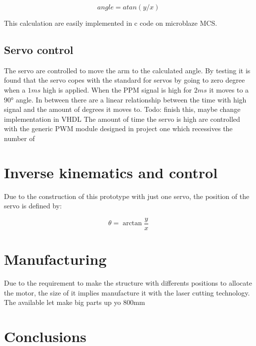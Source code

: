 		\begin{equation}
			angle = atan(y/x)
			\label{eq:angle}
		\end{equation}

		This calculation are easily implemented in c code on microblaze MCS.

		\subsection{Servo control}
		The servo are controlled to move the arm to the calculated angle. By testing it is found that the servo copes with the standard for servos by going to zero degree when a $1\si{ms}$ high is applied. When the PPM signal is high for $2\si{ms}$ it moves to a $90\si{\degree}$ angle. In between there are a linear relationship between the time with high signal and the amount of degrees it moves to.
		Todo: finish this, maybe change implementation in VHDL
		The amount of time the servo is high are controlled with the generic PWM module designed in project one which recessives the number of



	\section{Inverse kinematics and control}
		Due to the construction of this prototype with just one servo, the position of the servo is defined by:

		$$\theta = \arctan\frac{y}{x}$$

	\section{Manufacturing} %
	\label{sec:manufacturing}
		Due to the requirement to make the structure with differents positions to allocate the motor, the size of it implies manufacture it with the laser cutting technology. 
		The available let make big parts up yo 800mm 


	\section{Conclusions} %
	\label{sec:mec_conclusions}


